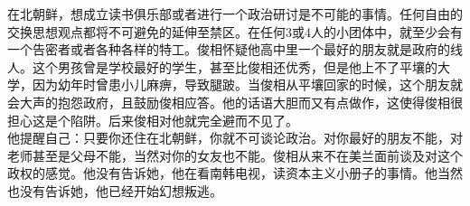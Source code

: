 在北朝鲜，想成立读书俱乐部或者进行一个政治研讨是不可能的事情。任何自由的交换思想观点都将不可避免的延伸至禁区。在任何3或4人的小团体中，就至少会有一个告密者或者各种各样的特工。俊相怀疑他高中里一个最好的朋友就是政府的线人。这个男孩曾是学校最好的学生，甚至比俊相还优秀，但是他上不了平壤的大学，因为幼年时曾患小儿麻痹，导致腿跛。当俊相从平壤回家的时候，这个朋友就会大声的抱怨政府，且鼓励俊相应答。他的话语大胆而又有点做作，这使得俊相很担心这是个陷阱。后来俊相对他就完全避而不见了。\\

他提醒自己：只要你还住在北朝鲜，你就不可谈论政治。对你最好的朋友不能，对老师甚至是父母不能，当然对你的女友也不能。俊相从来不在美兰面前谈及对这个政权的感觉。他没有告诉她，他在看南韩电视，读资本主义小册子的事情。他当然也没有告诉她，他已经开始幻想叛逃。\\
